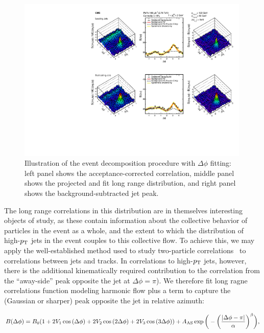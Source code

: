 \begin{figure}[hbt] 
\begin{center} 
\includegraphics[width=0.99\textwidth]{figures/Results/PAS_Figure_2_TrkPt1_TrkPt2.pdf}
\caption[Illustration of the event decomposition procedure with $\Delta\phi$ fitting]{Illustration of the event decomposition procedure with $\Delta\phi$ fitting:  left panel shows the acceptance-corrected correlation, middle panel shows the projected and fit long range distribution, and right panel shows the background-subtracted jet peak.}
\label{fig:BG_sub2}
\end{center} 
\end{figure}

The long range correlations in this distribution are in themselves interesting objects of study, as these contain information about the collective behavior of particles in the event as a whole, and the extent to which the distribution of high-$p_{\rm T}$ jets in the event couples to this collective flow.  To achieve this, we may apply the well-established method used to study two-particle correlations~\cite{Chatrchyan:2012wg} to correlations between jets and tracks.  In correlations to high-$p_{\rm T}$ jets, however, there is the additional kinematically required contribution to the correlation from the ``away-side'' peak opposite the jet at $\Delta\phi = \pi$). We therefore fit long ragne correlations function modeling harmonic flow plus a term to capture the (Gaussian or sharper) peak opposite the jet in relative azimuth:  

\begin{equation}
\label{eq:bkg_fit_as}
B(\Delta\phi) = B_{0}(1+2V_{\rm1}\cos{(\Delta\phi)}+2V_{\rm 2}\cos{(2\Delta\phi)}+2V_{\rm 3}\cos{(3\Delta\phi)})+A_{\rm AS}\exp{\bigg(-\bigg(\frac{|\Delta\phi-\pi|}{\alpha}\bigg)^{\beta} \bigg) },
\end{equation}

